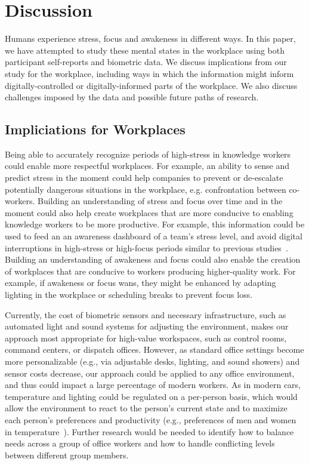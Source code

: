 \section{Discussion}

Humans experience stress, focus and awakeness in different ways.  In
this paper, we have attempted to study these mental states in the
workplace using both participant self-reports and biometric data. We
discuss implications from our study for the workplace, including ways
in which the information might inform digitally-controlled or
digitally-informed parts of the workplace. We also discuss 
challenges imposed by the data and possible future paths of
research.

\subsection{Impliciations for Workplaces}
Being able to accurately recognize periods of high-stress in knowledge
workers could enable more respectful workplaces. For example, an
ability to sense and predict stress in the moment could help companies
to prevent or de-escalate potentially dangerous situations in the
workplace, e.g. confrontation between co-workers. Building an 
understanding of stress and focus over time and in the moment
could also help create workplaces that are more conducive
to enabling knowledge workers to be more productive. For example,
this information could be used to feed an  
 an awareness dashboard of a team's stress level,
and avoid digital interruptions in high-stress or high-focus periods
similar to previous studies~\cite{zuger2017reducing}.  Building
an understanding of awakeness and focus could also enable the creation
of workplaces that are conducive to workers producing higher-quality
work. For example, if awakeness or focus wans, they might 
be enhanced by adapting lighting in the workplace 
or scheduling breaks to prevent focus loss.

Currently, the cost of biometric sensors and necessary infrastructure,
such as automated light and sound systems for adjusting the
environment, makes our approach most appropriate for high-value
workspaces, such as control rooms, command centers, or dispatch
offices. However, as standard office settings become more
personalizable (e.g., via adjustable desks, lighting, and sound
showers) and sensor costs decrease, our approach could be applied to
any office environment, and thus could impact a large percentage of
modern workers. As in modern cars, temperature and lighting could be
regulated on a per-person basis, which would allow the environment to
react to the person's current state and to maximize each person's
preferences and productivity (e.g., preferences of men and women in
temperature~\cite{Karjalainen07}). Further research would be needed to
identify how to balance needs across a group of office workers and how
to handle conflicting levels between different group members.




